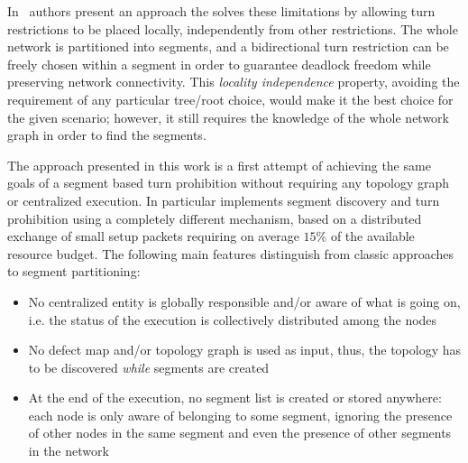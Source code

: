 In~\cite{mejia_ipdps06} authors present an approach the solves these
limitations by allowing turn restrictions to be placed locally,
independently from other restrictions. The whole network is
partitioned into segments, and a bidirectional turn
restriction can be freely chosen within a segment in order to guarantee
deadlock freedom while preserving network connectivity. This \emph{locality
independence} property, avoiding the requirement of any particular tree/root
choice, would make it the best choice for the given scenario;
however, it still requires the knowledge of the
whole network graph in order to find the segments. 

The \disr{} approach presented in this work is a first attempt of
achieving the same goals of a segment based turn prohibition  without
requiring any topology graph or centralized execution. In particular
\disr{} implements segment discovery and turn prohibition using a
completely different mechanism, based on a distributed exchange of
small setup packets requiring on average $15\%$ of the available
resource budget. The following main features distinguish \disr{}
from classic approaches to segment partitioning: 
\begin{itemize}
\item No centralized entity is globally responsible and/or aware of
what is going on, i.e. the status of the \disr{} execution is
collectively distributed among the nodes
\item  No defect map and/or topology graph is used as input,
thus, the topology has to be discovered \emph{while} segments are
created
\item At the end of the execution, no segment list is created or
stored anywhere: each node is only aware of belonging to some segment,
ignoring the presence of other nodes in the same segment and even the
presence of other segments in the network
\end{itemize}


